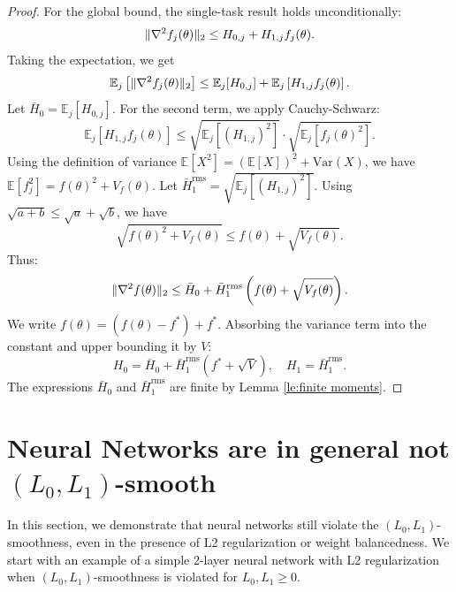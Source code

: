 \documentclass[a4paper,11pt]{article}
\DeclarePairedDelimiter{\norm}{\|}{\|}
\newcommand{\EE}{\mathbb{E}}
\newcommand{\1}{\mathbbm{1}}
\theoremstyle{plain}
\begin{document}
\begin{proof}
For the global bound, the single-task result holds unconditionally:
\begin{equation*}
    \norm{\nabla^2 f_j(\theta)}_2 \le H_{0,j} + H_{1,j} f_j(\theta).
\end{equation*}
Taking the expectation, we get
\begin{equation*}
    \EE_j \left[ \norm{\nabla^2 f_j(\theta)}_2 \right] \le \EE_j [H_{0,j}] + \EE_j \left[ H_{1,j} f_j(\theta) \right].
\end{equation*}
Let $\bar{H}_0 = \EE_j [H_{0,j}]$. For the second term, we apply Cauchy-Schwarz:
\begin{equation*}
    \EE_j \left[ H_{1,j}f_j(\theta) \right] \le \sqrt{\EE_j [(H_{1,j})^2]} \cdot \sqrt{\EE_j [f_j(\theta)^2]}.
\end{equation*}
Using the definition of variance $\EE [X^2] = (\EE[ X])^2 + \text{Var}(X)$, we have $\EE [f_j^2] = f(\theta)^2 + V_f(\theta)$.
Let $\bar{H}_1^{\mathrm{rms}} = \sqrt{\EE_j [(H_{1,j})^2]}$. Using $\sqrt{a+b} \le \sqrt{a} + \sqrt{b}$, we have
\begin{equation*}
    \sqrt{f(\theta)^2 + V_f(\theta)} \le f(\theta) + \sqrt{V_f(\theta)}.
\end{equation*}
Thus:
\begin{equation*}
    \norm{\nabla^2 f(\theta)}_2 \le \bar{H}_0 + \bar{H}_1^{\mathrm{rms}} \left( f(\theta) + \sqrt{V_f(\theta)} \right).
\end{equation*}
We write $f(\theta) = (f(\theta)-f^*) + f^*$. Absorbing the variance term into the constant and upper bounding it by $V$:
\begin{equation}
\label{eq:transformers_in_context_global_constants}
H_0 = \bar H_0 + \bar{H}_1^{\mathrm{rms}} \left( f^* + \sqrt{V} \right), \quad
    H_1 = \bar{H}_1^{\mathrm{rms}}.     
\end{equation}
The expressions $\bar{H}_0$ and $\bar{H}_1^{\mathrm{rms}}$ are finite by Lemma \ref{le:finite moments}.
\end{proof}











\section{Neural Networks are in general not $(L_0, L_1)$-smooth}\label{app:l0l1_failure}

In this section, we demonstrate that neural networks still violate the $(L_0, L_1)$-smoothness, even in the presence of L2 regularization or weight balancedness. We start with an example of a simple 2-layer neural network with L2 regularization when $(L_0, L_1)$-smoothness is violated for $L_0, L_1 \ge 0.$
\end{document}
